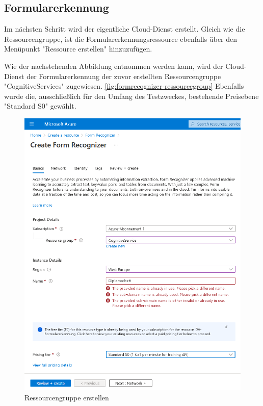 \subsection{Formularerkennung}
Im nächsten Schritt wird der eigentliche Cloud-Dienst erstellt. Gleich wie die Ressourcengruppe, ist die Formularerkennungsressource ebenfalls über
den Menüpunkt "Ressource erstellen" hinzuzufügen.

Wie der nachstehenden Abbildung entnommen werden kann, wird der Cloud-Dienst der Formularerkennung der zuvor erstellten Ressourcengruppe "CognitiveServices"
zugewiesen. \ref{fig:formrecognizer-ressourcegroup}
Ebenfalls wurde die, ausschließlich für den Umfang des Testzweckes, bestehende Preisebene "Standard S0" gewählt.


\begin{figure}[h]
    \centering
    \includegraphics[scale=0.6]{sections/cloud-computing/images/formrecognizer.png}
    \caption{Ressourcengruppe erstellen}
    \label{fig:kimldl-comparison}
\end{figure}

